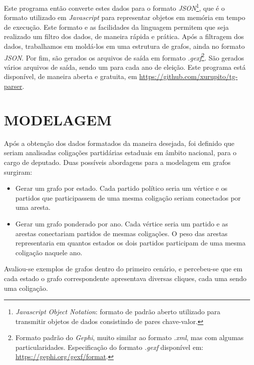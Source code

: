 Este programa então converte estes dados para o formato \emph{JSON}\footnote{\emph{Javascript Object Notation}: formato de padrão aberto utilizado para transmitir objetos de dados consistindo de pares chave-valor.}, que é o formato utilizado em \emph{Javascript} para representar objetos em memória em tempo de execução. Este formato e as facilidades da linguagem permitem que seja realizado um filtro dos dados, de maneira rápida e prática. Após a filtragem dos dados, trabalhamos em moldá-los em uma estrutura de grafos, ainda no formato \emph{JSON}. Por fim, são gerados os arquivos de saída em formato \emph{.gexf}\footnote{Formato padrão do \emph{Gephi}, muito similar ao formato \emph{.xml}, mas com algumas particularidades. Especificação do formato \emph{.gexf} disponível em: \url{https://gephi.org/gexf/format}.}. São gerados vários arquivos de saída, sendo um para cada ano de eleição. Este programa está disponível, de maneira aberta e gratuita, em \url{https://github.com/xurupito/tg-parser}.

\section{\texorpdfstring{\MakeUppercase{Modelagem}}{}}
\label{proposta__modelagem}

Após a obtenção dos dados formatados da maneira desejada, foi definido que seriam analisadas coligações partidárias estaduais em âmbito nacional, para o cargo de deputado. Duas possíveis abordagens para a modelagem em grafos surgiram:
\begin{itemize}
    \item Gerar um grafo por estado. Cada partido político seria um vértice e os partidos que participassem de uma mesma coligação seriam conectados por uma aresta.
    \item Gerar um grafo ponderado por ano. Cada vértice seria um partido e as arestas conectariam partidos de mesmas coligações. O peso das arestas representaria em quantos estados os dois partidos participam de uma mesma coligação naquele ano.
\end{itemize}

Avaliou-se exemplos de grafos dentro do primeiro cenário, e percebeu-se que em cada estado o grafo correspondente apresentava diversas cliques, cada uma sendo uma coligação.

